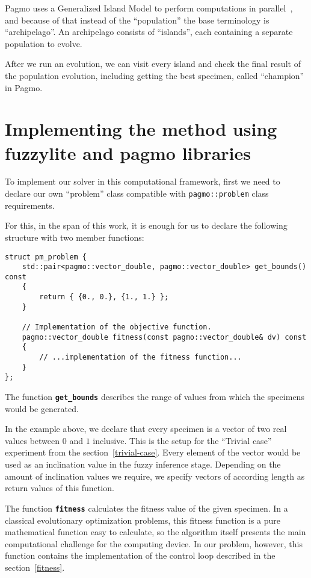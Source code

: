\documentclass[12pt, a4paper]{report}
\begin{document}
	Pagmo uses a Generalized Island Model to perform computations in parallel~\cite{Izzo2012}, and because of that instead of the ``population'' the base terminology is ``archipelago''.
	An archipelago consists of ``islands'', each containing a separate population to evolve.
	
	After we run an evolution, we can visit every island and check the final result of the population evolution, including getting the best specimen, called ``champion'' in Pagmo.
	
	\section{Implementing the method using fuzzylite and pagmo libraries}\label{section::implementation}
	
	To implement our solver in this computational framework, first we need to declare our own ``problem'' class compatible with \texttt{pagmo::problem} class requirements.
	
	For this, in the span of this work, it is enough for us to declare the following structure with two member functions:
	
	\begin{lstlisting}[language={[11]c++}]
struct pm_problem {
	std::pair<pagmo::vector_double, pagmo::vector_double> get_bounds() const
	{
		return { {0., 0.}, {1., 1.} };
	}
	
	// Implementation of the objective function.
	pagmo::vector_double fitness(const pagmo::vector_double& dv) const
	{
		// ...implementation of the fitness function...
	}
};
	\end{lstlisting}
	
	The function \textbf{\texttt{get\_bounds}} describes the range of values from which the specimens would be generated.
	
	In the example above, we declare that every specimen is a vector of two real values between $0$ and $1$ inclusive.
	This is the setup for the ``Trivial case'' experiment from the section~\ref{trivial-case}.
	Every element of the vector would be used as an inclination value in the fuzzy inference stage.
	Depending on the amount of inclination values we require, we specify vectors of according length as return values of this function.
	
	The function \textbf{\texttt{fitness}} calculates the fitness value of the given specimen.
	In a classical evolutionary optimization problems, this fitness function is a pure mathematical function easy to calculate, so the algorithm itself presents the main computational challenge for the computing device.
	In our problem, however, this function contains the implementation of the control loop described in the section~\ref{fitness}.
	
\end{document}
